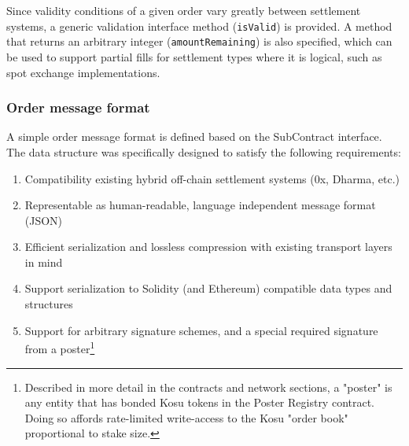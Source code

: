 \documentclass[10pt]{article}
\begin{document}
Since validity conditions of a given order vary greatly between settlement systems, a generic validation interface method (\texttt{isValid}) is provided. A method that returns an arbitrary integer (\texttt{amountRemaining}) is also specified, which can be used to support partial fills for settlement types where it is logical, such as spot exchange implementations.

\subsubsection{Order message format}\label{order-message-format}

A simple order message format is defined based on the SubContract interface. The data structure was specifically designed to satisfy the following requirements:

\begin{enumerate}
  \item Compatibility existing hybrid off-chain settlement systems (0x\cite{0x-wp}, Dharma\cite{dharma-wp}, etc.)
  \item Representable as human-readable, language independent message format (JSON)
  \item Efficient serialization and lossless compression with existing transport layers in mind
  \item Support serialization to Solidity (and Ethereum) compatible data types and structures
  \item Support for arbitrary signature schemes, and a special required signature from a poster\footnote{Described in more detail in the contracts and network sections, a "poster" is any entity that has bonded Kosu tokens in the Poster Registry contract. Doing so affords rate-limited write-access to the Kosu "order book" proportional to stake size.}
\end{enumerate}
\end{document}
